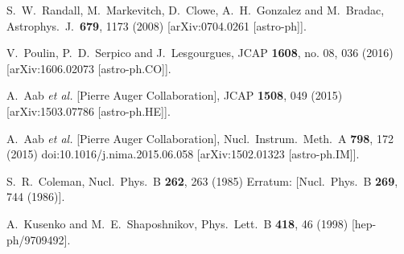   S.~W.~Randall, M.~Markevitch, D.~Clowe, A.~H.~Gonzalez and M.~Bradac,
  Astrophys.\ J.\  {\bf 679}, 1173 (2008)
  [arXiv:0704.0261 [astro-ph]].


  V.~Poulin, P.~D.~Serpico and J.~Lesgourgues,
  JCAP {\bf 1608}, no. 08, 036 (2016)
  [arXiv:1606.02073 [astro-ph.CO]].


  A.~Aab {\it et al.} [Pierre Auger Collaboration],
  JCAP {\bf 1508}, 049 (2015)
  [arXiv:1503.07786 [astro-ph.HE]].
  
  A.~Aab {\it et al.} [Pierre Auger Collaboration],
  Nucl.\ Instrum.\ Meth.\ A {\bf 798}, 172 (2015)
  doi:10.1016/j.nima.2015.06.058
  [arXiv:1502.01323 [astro-ph.IM]].


  S.~R.~Coleman,
  Nucl.\ Phys.\ B {\bf 262}, 263 (1985)
  Erratum: [Nucl.\ Phys.\ B {\bf 269}, 744 (1986)].


  A.~Kusenko and M.~E.~Shaposhnikov,
  Phys.\ Lett.\ B {\bf 418}, 46 (1998)
  [hep-ph/9709492].


